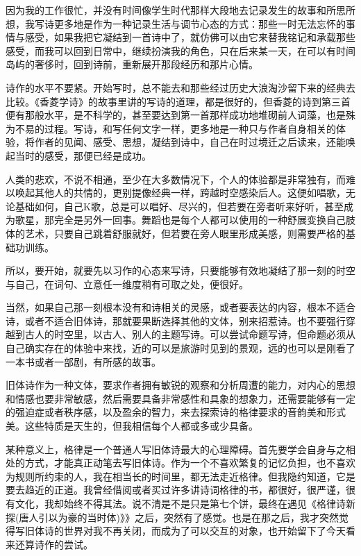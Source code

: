 \documentclass{article}
\begin{document}
因为我的工作很忙，并没有时间像学生时代那样大段地去记录发生的故事和所思所想，我写诗更多地是作为一种记录生活与调节心态的方式：那些一时无法忘怀的事情与感受，如果我把它凝结到一首诗中了，就仿佛可以由它来替我铭记和承载那些感受，而我可以回到日常中，继续扮演我的角色，只在后来某一天，在可以有时间岛屿的奢侈时，回到诗前，重新展开那段经历和那片心情。

诗作的水平不要紧。开始写时，总不能去和那些经过历史大浪淘沙留下来的经典去比较。《香菱学诗》的故事里讲的写诗的道理，都是很好的，但香菱的诗到第三首便有那般水平，是不科学的，甚至要达到第一首那样成功地堆砌前人词藻，也是殊为不易的过程。写诗，和写任何文字一样，更多地是一种只与作者自身相关的体验，将作者的见闻、感受、思想，凝结到诗中，自己在时过境迁之后读来，还能唤起当时的感受，那便已经是成功。

人类的悲欢，不说不相通，至少在大多数情况下，个人的体验都是非常独有，而难以唤起其他人的共情的，更别提像经典一样，跨越时空感染后人。这便如唱歌，无论基础如何，自己K歌，总是可以唱好、尽兴的，但若要在旁者听来好听，甚至成为歌星，那完全是另外一回事。舞蹈也是每个人都可以使用的一种舒展变换自己肢体的艺术，只要自己跳着舒服就好，但若要在旁人眼里形成美感，则需要严格的基础功训练。

所以，要开始，就要先以习作的心态来写诗，只要能够有效地凝结了那一刻的时空与自己，在词句、立意任一维度稍有可取之处，便很好。

当然，如果自己那一刻根本没有和诗相关的灵感，或者要表达的内容，根本不适合诗，或者不适合旧体诗，那就要果断选择其他的文体，别来招惹诗。也不要强行穿越到古人的时空里，以古人、别人的主题写诗。可以尝试命题写诗，但命题必须从自己确实存在的体验中来找，近的可以是旅游时见到的景观，远的也可以是刚看了一本书或者一部剧，有所感的故事。

旧体诗作为一种文体，要求作者拥有敏锐的观察和分析周遭的能力，对内心的思想和情感也要非常敏感，然后需要具备非常感性和具象的想象力，还需要能够有一定的强迫症或者秩序感，以及盈余的智力，来去探索诗的格律要求的音韵美和形式美。这些特质是天生的，但我相信每个人都或多或少具备。

某种意义上，格律是一个普通人写旧体诗最大的心理障碍。首先要学会自身与之相处的方式，才能真正动笔去写旧体诗。作为一个不喜欢繁复的记忆负担，也不喜欢为规则所约束的人，我在相当长的时间里，都无法走近格律。但我隐约知道，它是要去趋近的正道。我曾经借阅或者买过许多讲诗词格律的书，都很好，很严谨，很有文化，我却始终不得其法。说不清是不是只是第七个饼，最终在遇见《格律诗新探(唐人引以为豪的当时体)》》之后，突然有了感觉。也是在那之后，我才突然觉得写旧体诗的世界对我不再关闭，而成为了可以交互的对象，也开始留下了今天看来还算诗作的尝试。
\end{document}
